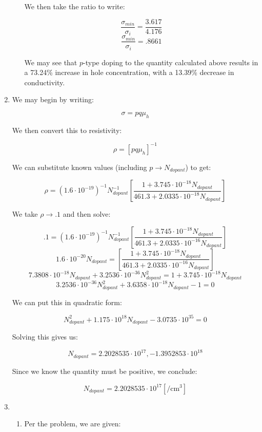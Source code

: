 \begin{enumerate}
\begin{enumerate}[label=\alph*]
        We then take the ratio to write:

        $$\frac{\sigma_{min}}{\sigma_i}=\frac{3.617}{4.176}$$
        $$\frac{\sigma_{min}}{\sigma_i}=.8661$$

        We may see that $p$-type doping to the quantity calculated above results in a 73.24\% increase in hole concentration, with a 13.39\% decrease in conductivity.

    \end{enumerate}

  \item We may begin by writing:

    $$\sigma=pq\mu_h$$

    We then convert this to resistivity:

    $$\rho=[pq\mu_h]^{-1}$$

    We can substitute known values (including $p\to N_{dopant}$) to get:

    $$\rho=(1.6\cdot10^{-19})^{-1}N_{dopant}^{-1}\left[ \frac{1+3.745\cdot10^{-18}N_{dopant}}{461.3+2.0335\cdot10^{-18}N_{dopant}} \right]$$

    We take $\rho\to.1$ and then solve:

    $$.1=(1.6\cdot10^{-19})^{-1}N_{dopant}^{-1}\left[ \frac{1+3.745\cdot10^{-18}N_{dopant}}{461.3+2.0335\cdot10^{-16}N_{dopant}} \right]$$
    $$1.6\cdot10^{-20}N_{dopant}=\left[ \frac{1+3.745\cdot10^{-18}N_{dopant}}{461.3+2.0335\cdot10^{-16}N_{dopant}} \right]$$
    $$7.3808\cdot10^{-18}N_{dopant}+3.2536\cdot10^{-36}N_{dopant}^2=1+3.745\cdot10^{-18}N_{dopant}$$
    $$3.2536\cdot10^{-36}N_{dopant}^2+3.6358\cdot10^{-18}N_{dopant}-1=0$$

    We can put this in quadratic form:

    $$N_{dopant}^2+1.175\cdot10^{18}N_{dopant}-3.0735\cdot10^{35}=0$$

    Solving this gives us:

    $$N_{dopant}=2.2028535\cdot10^{17},-1.3952853\cdot10^{18}$$

    Since we know the quantity must be positive, we conclude:

    $$\boxed{N_{dopant}=2.2028535\cdot10^{17}[\si{\per\centi\meter\cubed}]}$$

    \setcounter{enumi}{11}

  \item

    \begin{enumerate}[label=\alph*]

      \item Per the problem, we are given:


\end{enumerate}
\end{enumerate}
